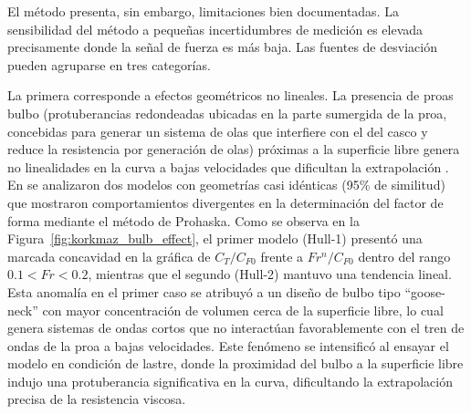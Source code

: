 El método presenta, sin embargo, limitaciones bien documentadas. La sensibilidad del método a pequeñas incertidumbres de medición es elevada precisamente donde la señal de fuerza es más baja. Las fuentes de desviación pueden agruparse en tres categorías.

La primera corresponde a efectos geométricos no lineales. La presencia de proas bulbo (protuberancias redondeadas ubicadas en la parte sumergida de la proa, concebidas para generar un sistema de olas que interfiere con el del casco y reduce la resistencia por generación de olas) próximas a la superficie libre genera no linealidades en la curva a bajas velocidades que dificultan la extrapolación \citep{korkmaz_cfd_2021}. En \citet{korkmaz_cfd_2021} se analizaron dos modelos con geometrías casi idénticas (95\% de similitud) que mostraron comportamientos divergentes en la determinación del factor de forma mediante el método de Prohaska. Como se observa en la Figura~\ref{fig:korkmaz_bulb_effect}, el primer modelo (Hull-1) presentó una marcada concavidad en la gráfica de $C_T/C_{F0}$ frente a $Fr^n/C_{F0}$ dentro del rango $0.1 < Fr < 0.2$, mientras que el segundo (Hull-2) mantuvo una tendencia lineal. Esta anomalía en el primer caso se atribuyó a un diseño de bulbo tipo ``goose-neck'' con mayor concentración de volumen cerca de la superficie libre, lo cual genera sistemas de ondas cortos que no interactúan favorablemente con el tren de ondas de la proa a bajas velocidades. Este fenómeno se intensificó al ensayar el modelo en condición de lastre, donde la proximidad del bulbo a la superficie libre indujo una protuberancia significativa en la curva, dificultando la extrapolación precisa de la resistencia viscosa.

